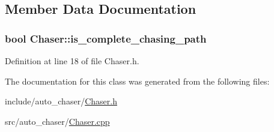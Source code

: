 \subsection{Member Data Documentation}
\subsubsection[{\texorpdfstring{is\+\_\+complete\+\_\+chasing\+\_\+path}{is_complete_chasing_path}}]{\setlength{\rightskip}{0pt plus 5cm}bool Chaser\+::is\+\_\+complete\+\_\+chasing\+\_\+path}\hypertarget{class_chaser_a53af032471ad6bdc828c4eae78085813}{}\label{class_chaser_a53af032471ad6bdc828c4eae78085813}


Definition at line 18 of file Chaser.\+h.



The documentation for this class was generated from the following files\+:\begin{DoxyCompactItemize}
\item 
include/auto\+\_\+chaser/\hyperlink{_chaser_8h}{Chaser.\+h}\item 
src/auto\+\_\+chaser/\hyperlink{_chaser_8cpp}{Chaser.\+cpp}\end{DoxyCompactItemize}
